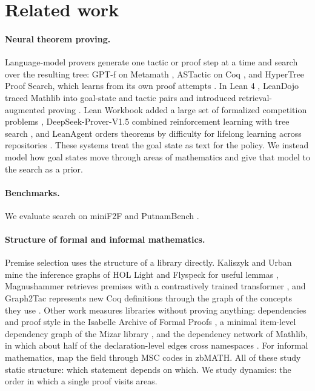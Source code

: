\section{Related work}
\label{sec:related}

\paragraph{Neural theorem proving.}
Language-model provers generate one tactic or proof step at a time and
search over the resulting tree: GPT-f on Metamath \citep{polu2020generative},
ASTactic on Coq \citep{yang2019learning}, and HyperTree Proof Search, which
learns from its own proof attempts \citep{lample2022hypertree}. In Lean 4
\citep{demoura2021lean4}, LeanDojo traced Mathlib \citep{mathlib2020} into
goal-state and tactic pairs and introduced retrieval-augmented proving
\citep{yang2023leandojo}. Lean Workbook added a large set of formalized
competition problems \citep{ying2024leanworkbook}, DeepSeek-Prover-V1.5
combined reinforcement learning with tree search \citep{xin2025deepseekproverv15},
and LeanAgent orders theorems by difficulty for lifelong learning across
repositories \citep{kumarappan2025leanagent}. These systems treat the goal
state as text for the policy. We instead model how goal states move through
areas of mathematics and give that model to the search as a prior.

\paragraph{Benchmarks.}
We evaluate search on miniF2F \citep{zheng2022minif2f} and PutnamBench
\citep{tsoukalas2024putnambench}.

\paragraph{Structure of formal and informal mathematics.}
Premise selection uses the structure of a library directly. Kaliszyk and
Urban mine the inference graphs of HOL Light and Flyspeck for useful lemmas
\citep{kaliszyk2015learning}, Magnushammer retrieves premises with a
contrastively trained transformer \citep{mikula2024magnushammer}, and
Graph2Tac represents new Coq definitions through the graph of the concepts
they use \citep{blaauwbroek2024graph2tac}. Other work measures libraries
without proving anything: dependencies and proof style in the Isabelle
Archive of Formal Proofs \citep{blanchette2015mining}, a minimal item-level
dependency graph of the Mizar library \citep{alama2011mizar}, and the
dependency network of Mathlib, in which about half of the declaration-level
edges cross namespaces \citep{li2026network}. For informal mathematics,
\citet{cerinsek2015network} map the field through MSC codes in zbMATH.
All of these study static structure: which statement depends on which.
We study dynamics: the order in which a single proof visits areas.

